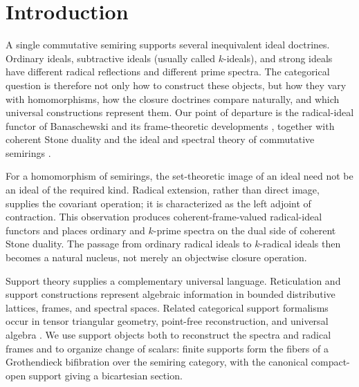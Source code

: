 \documentclass[12pt,leqno]{amsart}
\theoremstyle{definition}
\numberwithin{equation}{section}
\theoremstyle{remark}
\begin{document}
\maketitle

\tableofcontents

\section{Introduction}

A single commutative semiring supports several inequivalent ideal doctrines. Ordinary ideals, subtractive ideals (usually called $k$-ideals), and strong ideals have different radical reflections and different prime spectra. The categorical question is therefore not only how to construct these objects, but how they vary with homomorphisms, how the closure doctrines compare naturally, and which universal constructions represent them. Our point of departure is the radical-ideal functor of Banaschewski and its frame-theoretic developments \cite{Banaschewski,Dube18,Martinez}, together with coherent Stone duality \cite{Hochster,Johnstone,Picado,SpectralBook} and the ideal and spectral theory of commutative semirings \cite{Golan,Lescot,AG24,Ray22}.

For a homomorphism of semirings, the set-theoretic image of an ideal need not be an ideal of the required kind. Radical extension, rather than direct image, supplies the covariant operation; it is characterized as the left adjoint of contraction. This observation produces coherent-frame-valued radical-ideal functors and places ordinary and $k$-prime spectra on the dual side of coherent Stone duality. The passage from ordinary radical ideals to $k$-radical ideals then becomes a natural nucleus, not merely an objectwise closure operation.

Support theory supplies a complementary universal language. Reticulation and support constructions \cite{Simmons,JoyalSupport,Johnstone} represent algebraic information in bounded distributive lattices, frames, and spectral spaces. Related categorical support formalisms occur in tensor triangular geometry, point-free reconstruction, and universal algebra \cite{Balmer07,Kock,Georgescu21,Krause24}. We use support objects both to reconstruct the spectra and radical frames and to organize change of scalars: finite supports form the fibers of a Grothendieck bifibration over the semiring category, with the canonical compact-open support giving a bicartesian section.
\end{document}
